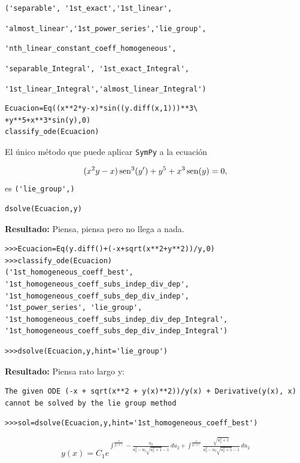 \verb+('separable', '1st_exact','1st_linear',+

\verb+'almost_linear','1st_power_series','lie_group',+


\verb+'nth_linear_constant_coeff_homogeneous', +

\verb+'separable_Integral', '1st_exact_Integral',  +

\verb+'1st_linear_Integral','almost_linear_Integral')+

\begin{lstlisting}
Ecuacion=Eq((x**2*y-x)*sin((y.diff(x,1)))**3\
+y**5+x**3*sin(y),0)
classify_ode(Ecuacion)
\end{lstlisting}

El único método que puede aplicar \texttt{SymPy} a la ecuación

\[(x^ 2y-x)\sen^ 3(y')+y^ 5+x^3\sen(y)=0,\]
es \verb+('lie_group',)+
\begin{lstlisting}
dsolve(Ecuacion,y)
\end{lstlisting}
 \noindent\textbf{Resultado:} Piensa, piensa   pero no llega a nada.

\begin{lstlisting}
>>>Ecuacion=Eq(y.diff()+(-x+sqrt(x**2+y**2))/y,0)
>>>classify_ode(Ecuacion)
('1st_homogeneous_coeff_best',
'1st_homogeneous_coeff_subs_indep_div_dep',
'1st_homogeneous_coeff_subs_dep_div_indep',
'1st_power_series', 'lie_group',
'1st_homogeneous_coeff_subs_indep_div_dep_Integral',
'1st_homogeneous_coeff_subs_dep_div_indep_Integral')
\end{lstlisting}

\begin{lstlisting}
>>>dsolve(Ecuacion,y,hint='lie_group')
\end{lstlisting}

 \noindent\textbf{Resultado:} Piensa rato largo y:
\begin{lstlisting}
The given ODE (-x + sqrt(x**2 + y(x)**2))/y(x) + Derivative(y(x), x)
cannot be solved by the lie group method
\end{lstlisting}


\begin{lstlisting}
>>>sol=dsolve(Ecuacion,y,hint='1st_homogeneous_coeff_best')
\end{lstlisting}

\[y{\left (x \right )} = C_{1} e^{\int^{\frac{x}{y{\left (x \right )}}} -\frac{u_{2}}{u_{2}^{2} - u_{2} \sqrt{u_{2}^{2} + 1} - 1}\, du_{2} + \int^{\frac{x}{y{\left (x \right )}}} \frac{\sqrt{u_{2}^{2} + 1}}{u_{2}^{2} - u_{2} \sqrt{u_{2}^{2} + 1} - 1}\, du_{2}}\]



